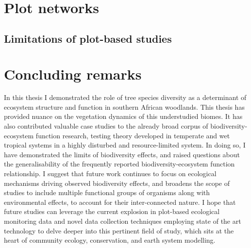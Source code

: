 \begin{refsection}

\section{Plot networks}



\subsection{Limitations of plot-based studies}


\section{Concluding remarks}

In this thesis I demonstrated the role of tree species diversity as a determinant of ecosystem structure and function in southern African woodlands. This thesis has provided nuance on the vegetation dynamics of this understudied biomes. It has also contributed valuable case studies to the already broad corpus of biodiversity-ecosystem function research, testing theory developed in temperate and wet tropical systems in a highly disturbed and resource-limited system. In doing so, I have demonstrated the limits of biodiversity effects, and raised questions about the generalisability of the frequently reported biodiversity-ecosystem function relationship. I suggest that future work continues to focus on ecological mechanisms driving observed biodiversity effects, and broadens the scope of studies to include multiple functional groups of organisms along with environmental effects, to account for their inter-connected nature. I hope that future studies can leverage the current explosion in plot-based ecological monitoring data and novel data collection techniques employing state of the art technology to delve deeper into this pertinent field of study, which sits at the heart of community ecology, conservation, and earth system modelling.

\newpage{}
\begingroup
{}
\printbibliography[heading=subbibintoc]
\endgroup

\end{refsection}

